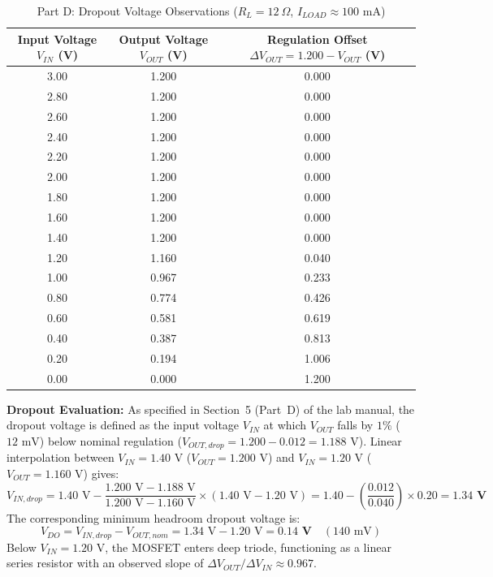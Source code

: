 \documentclass[11pt,a4paper]{article}
\begin{document}
\begin{table}[H]
\centering
\caption{Part D: Dropout Voltage Observations ($R_L = 12\ \Omega$, $I_{LOAD} \approx 100\text{ mA}$)}
\label{tab:part_d}
\begin{tabular}{@{}ccc@{}}
\toprule
\textbf{Input Voltage $V_{IN}$ (V)} & \textbf{Output Voltage $V_{OUT}$ (V)} & \textbf{Regulation Offset $\Delta V_{OUT} = 1.200 - V_{OUT}$ (V)} \\ \midrule
3.00 & 1.200 & 0.000 \\
2.80 & 1.200 & 0.000 \\
2.60 & 1.200 & 0.000 \\
2.40 & 1.200 & 0.000 \\
2.20 & 1.200 & 0.000 \\
2.00 & 1.200 & 0.000 \\
1.80 & 1.200 & 0.000 \\
1.60 & 1.200 & 0.000 \\
1.40 & 1.200 & 0.000 \\
1.20 & 1.160 & 0.040 \\
1.00 & 0.967 & 0.233 \\
0.80 & 0.774 & 0.426 \\
0.60 & 0.581 & 0.619 \\
0.40 & 0.387 & 0.813 \\
0.20 & 0.194 & 1.006 \\
0.00 & 0.000 & 1.200 \\
\bottomrule
\end{tabular}
\end{table}

\textbf{Dropout Evaluation:} As specified in Section~5 (Part~D) of the lab manual, the dropout voltage is defined as the input voltage $V_{IN}$ at which $V_{OUT}$ falls by $1\%$ ($12\text{ mV}$) below nominal regulation ($V_{OUT,drop} = 1.200 - 0.012 = 1.188\text{ V}$). Linear interpolation between $V_{IN} = 1.40\text{ V}$ ($V_{OUT} = 1.200\text{ V}$) and $V_{IN} = 1.20\text{ V}$ ($V_{OUT} = 1.160\text{ V}$) gives:
\begin{equation}
    V_{IN,drop} = 1.40\text{ V} - \frac{1.200\text{ V} - 1.188\text{ V}}{1.200\text{ V} - 1.160\text{ V}} \times (1.40\text{ V} - 1.20\text{ V}) = 1.40 - \left(\frac{0.012}{0.040}\right) \times 0.20 = \mathbf{1.34\text{ V}}
\end{equation}
The corresponding minimum headroom dropout voltage is:
\begin{equation}
    V_{DO} = V_{IN,drop} - V_{OUT,nom} = 1.34\text{ V} - 1.20\text{ V} = \mathbf{0.14\text{ V}} \quad (140\text{ mV})
\end{equation}
Below $V_{IN} = 1.20\text{ V}$, the MOSFET enters deep triode, functioning as a linear series resistor with an observed slope of $\Delta V_{OUT} / \Delta V_{IN} \approx 0.967$.
\end{document}
